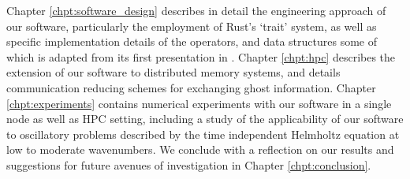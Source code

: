 Chapter \ref{chpt:software_design} describes in detail the engineering approach of our software, particularly the employment of Rust's `trait' system, as well as specific implementation details of the  operators, and data structures some of which is adapted from its first presentation in \cite{kailasa2024kifmmrs}. Chapter \ref{chpt:hpc} describes the extension of our software to distributed memory systems, and details communication reducing schemes for exchanging ghost information. Chapter \ref{chpt:experiments} contains numerical experiments with our software in a single node as well as HPC setting, including a study of the applicability of our software to oscillatory problems described by the time independent Helmholtz equation at low to moderate wavenumbers. We conclude with a reflection on our results and suggestions for future avenues of investigation in Chapter \ref{chpt:conclusion}.


